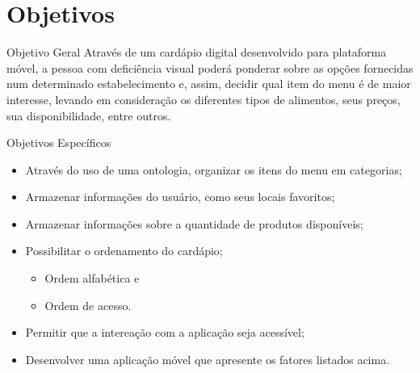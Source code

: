 \section{Objetivos}\label{sec:objetivos}
\begin{frame}[allowframebreaks]{Objetivo Geral}
	Através de um cardápio digital desenvolvido para plataforma móvel, a pessoa com deficiência visual poderá ponderar sobre as opções fornecidas num determinado estabelecimento e, assim, decidir qual item do menu é de maior interesse, levando em consideração os diferentes tipos de alimentos, seus preços, sua disponibilidade, entre outros.
\end{frame}

\begin{frame}[allowframebreaks]{Objetivos Específicos}
	\begin{itemize}
		\setlength{\itemsep}{0.5em}
		\item<1-> Através do uso de uma ontologia, organizar os itens do menu em categorias;
		\item<1-> Armazenar informações do usuário, como seus locais favoritos;
		\item<1-> Armazenar informações sobre a quantidade de produtos disponíveis;
		\item<1-> Possibilitar o ordenamento do cardápio;
			\begin{itemize}
				\item<1-> Ordem alfabética e
				\item<1-> Ordem de acesso. 
			\end{itemize}
		\item<1-> Permitir que a intereação com a aplicação seja acessível;
		\item<1-> Desenvolver uma aplicação móvel que apresente os fatores listados acima.
	\end{itemize}
\end{frame}